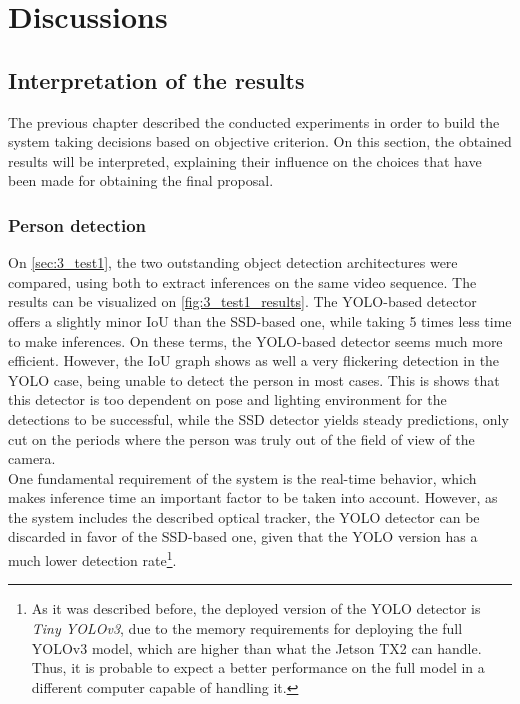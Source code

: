 \chapter{Discussions}


\section{Interpretation of the results}
The previous chapter described the conducted experiments in order to build the system taking decisions based on objective criterion. On this section, the obtained results will be interpreted, explaining their influence on the choices that have been made for obtaining the final proposal.\\

\subsection{Person detection}

On \autoref{sec:3_test1}, the two outstanding object detection architectures were compared, using both to extract inferences on the same video sequence. The results can be visualized on \autoref{fig:3_test1_results}. The YOLO-based detector offers a slightly minor IoU than the SSD-based one, while taking 5 times less time to make inferences. On these terms, the YOLO-based detector seems much more efficient. However, the IoU graph shows as well a very flickering detection in the YOLO case, being unable to detect the person in most cases. This is shows that this detector is too dependent on pose and lighting environment for the detections to be successful, while the SSD detector yields steady predictions, only cut on the periods where the person was truly out of the field of view of the camera.\\

One fundamental requirement of the system is the real-time behavior, which makes inference time an important factor to be taken into account. However, as the system includes the described optical tracker, the YOLO detector can be discarded in favor of the SSD-based one, given that the YOLO version has a much lower detection rate\footnote{As it was described before, the deployed version of the YOLO detector is \textit{Tiny YOLOv3}, due to the memory requirements for deploying the full YOLOv3 model, which are higher than what the Jetson TX2 can handle. Thus, it is probable to expect a better performance on the full model in a different computer capable of handling it.}.\\

